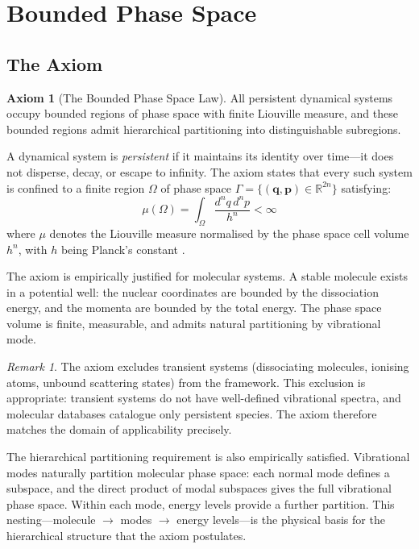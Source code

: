 \documentclass[11pt,twocolumn,a4paper]{article}
\theoremstyle{definition}
\newtheorem{axiom}{Axiom}
\theoremstyle{remark}
\newtheorem{remark}[theorem]{Remark}
\newcommand{\Real}{\mathbb{R}}
\begin{document}
\section{Bounded Phase Space}
\label{sec:bounded_phase_space}

\subsection{The Axiom}

\begin{axiom}[The Bounded Phase Space Law]
\label{ax:bpsl}
All persistent dynamical systems occupy bounded regions of phase space with finite Liouville measure, and these bounded regions admit hierarchical partitioning into distinguishable subregions.
\end{axiom}

A dynamical system is \emph{persistent} if it maintains its identity over time---it does not disperse, decay, or escape to infinity. The axiom states that every such system is confined to a finite region $\Omega$ of phase space $\Gamma = \{(\mathbf{q}, \mathbf{p}) \in \Real^{2n}\}$ satisfying:
\begin{equation}
\mu(\Omega) = \int_\Omega \frac{d^n q \, d^n p}{h^n} < \infty
\label{eq:finite_measure}
\end{equation}
where $\mu$ denotes the Liouville measure normalised by the phase space cell volume $h^n$, with $h$ being Planck's constant \citep{planck1901}.

The axiom is empirically justified for molecular systems. A stable molecule exists in a potential well: the nuclear coordinates are bounded by the dissociation energy, and the momenta are bounded by the total energy. The phase space volume is finite, measurable, and admits natural partitioning by vibrational mode.

\begin{remark}
The axiom excludes transient systems (dissociating molecules, ionising atoms, unbound scattering states) from the framework. This exclusion is appropriate: transient systems do not have well-defined vibrational spectra, and molecular databases catalogue only persistent species. The axiom therefore matches the domain of applicability precisely.
\end{remark}

The hierarchical partitioning requirement is also empirically satisfied. Vibrational modes naturally partition molecular phase space: each normal mode defines a subspace, and the direct product of modal subspaces gives the full vibrational phase space. Within each mode, energy levels provide a further partition. This nesting---molecule $\to$ modes $\to$ energy levels---is the physical basis for the hierarchical structure that the axiom postulates.
\end{document}
